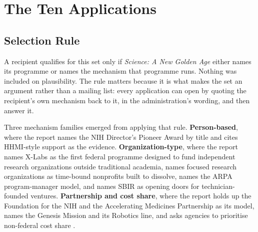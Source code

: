 \section{The Ten Applications}

\subsection{Selection Rule}

A recipient qualifies for this set only if \textit{Science: A New Golden Age}
either names its programme or names the mechanism that programme runs. Nothing
was included on plausibility. The rule matters because it is what makes the set
an argument rather than a mailing list: every application can open by quoting the
recipient's own mechanism back to it, in the administration's wording, and then
answer it.

Three mechanism families emerged from applying that rule. \textbf{Person-based},
where the report names the NIH Director's Pioneer Award by title and cites
HHMI-style support as the evidence. \textbf{Organization-type}, where the report
names X-Labs as the first federal programme designed to fund independent
research organizations outside traditional academia, names focused research
organizations as time-bound nonprofits built to dissolve, names the ARPA
program-manager model, and names SBIR as opening doors for technician-founded
ventures. \textbf{Partnership and cost share}, where the report holds up the
Foundation for the NIH and the Accelerating Medicines Partnership as its model,
names the Genesis Mission and its Robotics line, and asks agencies to prioritise
non-federal cost share \cite{kratsiosvought2026fy2028priorities}.

